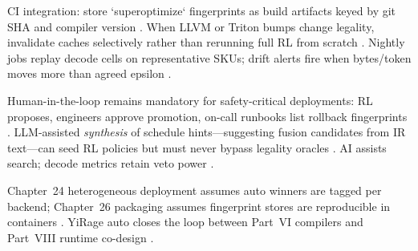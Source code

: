 CI integration: store `superoptimize` fingerprints as build artifacts keyed by git SHA and compiler version \citep{yirage2026,chen2020compilerbasedhardw}. When LLVM or Triton bumps change legality, invalidate caches selectively rather than rerunning full RL from scratch \citep{chen2020compilerbasedhardw,semianalysis2024tma,amd2024xdna}. Nightly jobs replay decode cells on representative SKUs; drift alerts fire when bytes/token moves more than agreed epsilon \citep{memoryfloor2026,taxbreak2026,patel2025llminference,kwon2023vllm,liu2024deepseekv3,dao2022flashattention,amd2024aie,dlbook,nvidia2024cudagraphs,nvidia2022hopper,dao2023flashdecoding}.

Human-in-the-loop remains mandatory for safety-critical deployments: RL proposes, engineers approve promotion, on-call runbooks list rollback fingerprints \citep{patel2025llminference,yirage2026,chen2020compilerbasedhardw,memoryfloor2026}. LLM-assisted \emph{synthesis} of schedule hints---suggesting fusion candidates from IR text---can seed RL policies but must never bypass legality oracles \citep{yirage2026,liu2024deepseekv3,dlbook,taxbreak2026,kwon2023vllm,amd2024xdna,amd2024aie,semianalysis2024tma,dao2022flashattention,dao2023flashdecoding,nvidia2024cudagraphs,nvidia2022hopper,memoryfloor2026,patel2025llminference,chen2020compilerbasedhardw}. AI assists search; decode metrics retain veto power \citep{taxbreak2026,memoryfloor2026,patel2025llminference,yirage2026,dlbook}.

Chapter~24 heterogeneous deployment assumes auto winners are tagged per backend; Chapter~26 packaging assumes fingerprint stores are reproducible in containers \citep{chen2020compilerbasedhardw,yirage2026,amd2024aie,patel2025llminference,kwon2023vllm,liu2024deepseekv3,taxbreak2026,memoryfloor2026,semianalysis2024tma,amd2024xdna,dlbook,dao2022flashattention,dao2023flashdecoding,nvidia2024cudagraphs,nvidia2022hopper}. YiRage auto closes the loop between Part~VI compilers and Part~VIII runtime co-design \citep{yirage2026,kwon2023vllm,patel2025llminference,chen2020compilerbasedhardw,liu2024deepseekv3,memoryfloor2026,taxbreak2026,amd2024aie,dlbook,semianalysis2024tma,amd2024xdna,dao2022flashattention,dao2023flashdecoding,nvidia2024cudagraphs,nvidia2022hopper}.

